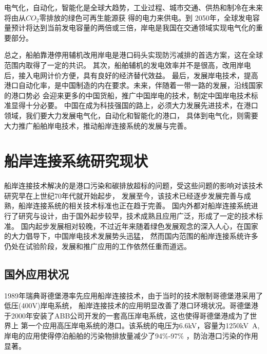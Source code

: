 \begin{table}[!htp]
	\centering
	\caption[中国岸电替代辅机发电的减排表现]{中国岸电替代辅机发电的减排表现\cite{SP3}}
	\label{tab:岸电替代效益}
\end{table}

电气化，自动化，智能化是全球大趋势，工业过程、城市交通、供热和制冷在未来将由从$CO_{2}$零排放的绿色可再生能源获
得的电力来供电。到 2050年，全球发电容量预计将达到当前发电容量的两倍或三倍，岸电是我国在交通领域实现电气化的重要部分。

总之，船舶靠港停用辅机改用岸电是港口码头实现防污减排的首选方案，这在全球范围内取得了一定的共识。
其次，船舶辅机的发电效率并不是很高，改用岸电后，接入电网计价方便，具有良好的经济替代效益。
最后，发展岸电技术，提高港口自动化率，是中国制造的内在要求。未来，伴随着一带一路的发展，沿线国家的港口势必
会迎来更多的中国货船，推广中国岸电的技术，制定中国岸电技术标准显得十分必要。
中国在成为科技强国的路上，必须大力发展先进技术，在港口领域，我们要大力发展电气化，自动化和智能化的港口，
具体到电气化，则需要大力推广船舶岸电技术，推动船岸连接系统的发展与完善。


\section{船岸连接系统研究现状}
船岸连接技术解决的是港口污染和碳排放超标的问题，受这些问题的影响对该技术研究早在上世纪70年代就开始起步，
发展至今，该技术已经逐步发展完善与成熟，船岸连接系统的相关技术标准也正在趋于完善。
国内外都对船岸连接系统进行了研究与设计，由于国外起步较早，技术成熟且应用广泛，形成了一定的技术标准。
国内起步发展相对较晚，不过近年来随着绿色发展观念的深入人心，在国家的大力倡导下，中国岸电技术发展势头迅猛，
然而国内范围的船岸连接系统许多仍处在试验阶段，发展和推广应用的工作依然任重而道远\cite{SP4}。

\subsection{国外应用状况}
1989年瑞典哥德堡港率先应用船岸连接技术，由于当时的技术限制哥德堡港采用了低压(400V)岸电系统，
船岸连接技术的应用明显改善了港口环境状况。哥德堡港于2000年安装了ABB公司开发的一套高压岸电系统，这也使得哥德堡港成为了世界上
第一个应用高压岸电系统的港口。该系统的电压为6.6kV，容量为1250\si{kV.A},岸电的应用使得停泊船舶的污染物排放量减少了94\%-97\%
\cite{SP4}，防治港口污染的作用显著。

